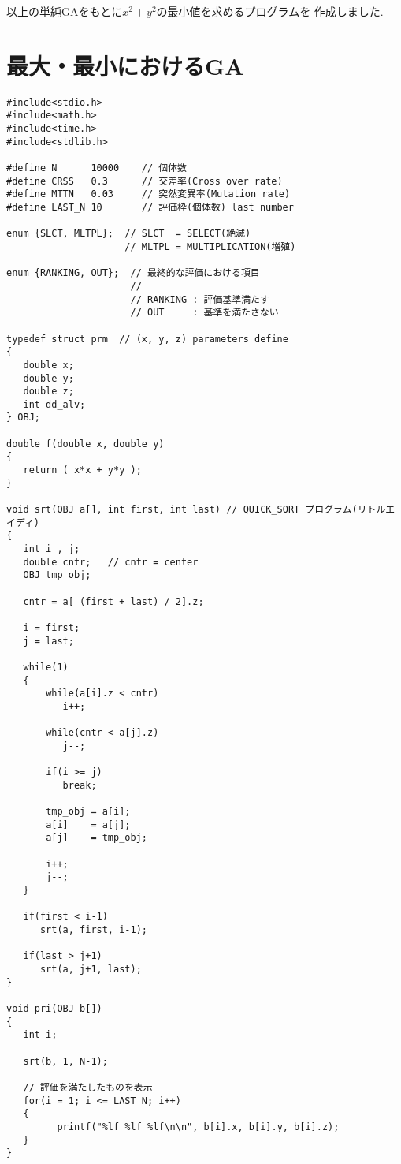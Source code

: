 \documentclass[a4paper,titlepage]{jreport}
\begin{document}
以上の単純GAをもとに$x^{2}+y^{2}$の最小値を求めるプログラムを
作成しました.

\section{最大・最小におけるGA}

\begin{verbatim}
#include<stdio.h>
#include<math.h>
#include<time.h>
#include<stdlib.h>

#define N      10000    // 個体数
#define CRSS   0.3      // 交差率(Cross over rate)
#define MTTN   0.03     // 突然変異率(Mutation rate)
#define LAST_N 10       // 評価枠(個体数) last number

enum {SLCT, MLTPL};  // SLCT  = SELECT(絶滅)
                     // MLTPL = MULTIPLICATION(増殖)

enum {RANKING, OUT};  // 最終的な評価における項目
                      // 
                      // RANKING : 評価基準満たす
                      // OUT     : 基準を満たさない

typedef struct prm  // (x, y, z) parameters define
{
   double x;
   double y;
   double z;
   int dd_alv;
} OBJ;

double f(double x, double y)
{
   return ( x*x + y*y );
}

void srt(OBJ a[], int first, int last) // QUICK_SORT プログラム(リトルエイディ)
{
   int i , j;
   double cntr;   // cntr = center
   OBJ tmp_obj;

   cntr = a[ (first + last) / 2].z;

   i = first;
   j = last;

   while(1)
   {
       while(a[i].z < cntr)
          i++;

       while(cntr < a[j].z)
          j--;

       if(i >= j)
          break;

       tmp_obj = a[i];
       a[i]    = a[j];
       a[j]    = tmp_obj;

       i++;
       j--;
   }

   if(first < i-1) 
      srt(a, first, i-1);

   if(last > j+1)
      srt(a, j+1, last);
}

void pri(OBJ b[])
{
   int i;

   srt(b, 1, N-1);

   // 評価を満たしたものを表示
   for(i = 1; i <= LAST_N; i++)
   {
         printf("%lf %lf %lf\n\n", b[i].x, b[i].y, b[i].z);
   }
}


\end{verbatim}
\end{document}
